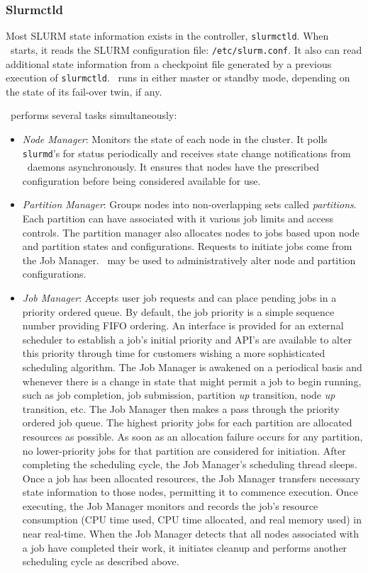 \subsubsection{Slurmctld}

Most SLURM state information exists in the controller, {\tt slurmctld}.
When \slurmctld\ starts, it reads the SLURM configuration file: 
{\tt /etc/slurm.conf}.  It also can read additional state information
from a checkpoint file generated by a previous execution of {\tt slurmctld}.
\slurmctld\ runs in either master or standby mode, depending on the
state of its fail-over twin, if any.

\slurmctld\ performs several tasks simultaneously:

\begin{itemize}
\item {\em Node Manager}: Monitors the state of each node in
the cluster.  It polls {\tt slurmd}'s for status periodically and
receives state change notifications from \slurmd\ daemons asynchronously.
It ensures that nodes have the prescribed configuration before being 
considered available for use.

\item {\em Partition Manager}: Groups nodes into non-overlapping sets called
{\em partitions}. Each partition can have associated with it various job
limits and access controls.  The partition manager also allocates nodes
to jobs based upon node and partition states and configurations. Requests
to initiate jobs come from the Job Manager.  \scontrol\ may be used
to administratively alter node and partition configurations.

\item {\em Job Manager}: Accepts user job requests and can
place pending jobs in a priority ordered queue. By default, the job
priority is a simple sequence number providing FIFO ordering.
An interface is provided for an external scheduler to establish a job's
initial priority and API's are available to alter this priority through
time for customers wishing a more sophisticated scheduling algorithm.
The Job Manager is awakened on a periodical basis and whenever there
is a change in state that might permit a job to begin running, such
as job completion, job submission, partition {\em up} transition,
node {\em up} transition, etc.  The Job Manager then makes a pass
through the priority ordered job queue. The highest priority jobs 
for each partition are allocated resources as possible. As soon as an 
allocation failure occurs for any partition, no lower-priority jobs for 
that partition are considered for initiation. 
After completing the scheduling cycle, the Job Manager's scheduling
thread sleeps.  Once a job has been allocated resources, the Job Manager
transfers necessary state information to those nodes, permitting it 
to commence execution.  Once executing, the Job Manager monitors and records
the job's resource consumption (CPU time used, CPU time allocated, and
real memory used) in near real-time.  When the Job Manager detects that
all nodes associated with a job have completed their work, it initiates
cleanup and performs another scheduling cycle as described above.


\end{itemize}
